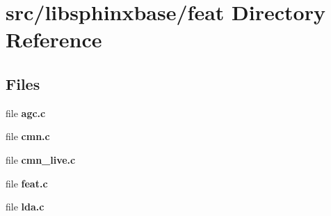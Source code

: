 \section{src/libsphinxbase/feat Directory Reference}
\label{dir_4d78eab29b32367e0c8277af3fb65de0}
\subsection*{Files}
\begin{DoxyCompactItemize}
\item 
file {\bfseries agc.\-c}
\item 
file {\bfseries cmn.\-c}
\item 
file {\bfseries cmn\-\_\-live.\-c}
\item 
file {\bfseries feat.\-c}
\item 
file {\bfseries lda.\-c}
\end{DoxyCompactItemize}
